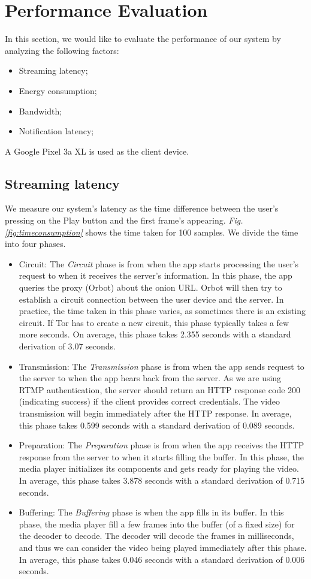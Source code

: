 \section{Performance Evaluation}
In this section, we would like to evaluate the performance of our system by analyzing the following factors:
\begin{itemize}
	\item Streaming latency;
	\item Energy consumption;
	\item Bandwidth;
	\item Notification latency;
\end{itemize}

A Google Pixel 3a XL is used as the client device.

\subsection{Streaming latency}
\label{subsec:streaming_latency}
We measure our system's latency as the time difference between the user’s pressing on the Play button and the first frame’s appearing. \textit{Fig. \ref{fig:timeconsumption}} shows the time taken for 100 samples. We divide the time into four phases.
\begin{itemize}
	\item Circuit: The \textit{Circuit} phase is from when the app starts processing the user’s request to when it receives the server's information. In this phase, the app queries the proxy (Orbot) about the onion URL. Orbot will then try to establish a circuit connection between the user device and the server. In practice, the time taken in this phase varies, as sometimes there is an existing circuit. If Tor has to create a new circuit, this phase typically takes a few more seconds. On average, this phase takes 2.355 seconds with a standard derivation of 3.07 seconds.
	\item Transmission: The \textit{Transmission} phase is from when the app sends request to the server to when the app hears back from the server. As we are using RTMP authentication, the server should return an HTTP response code 200 (indicating success) if the client provides correct credentials. The video transmission will begin immediately after the HTTP response. In average, this phase takes 0.599 seconds with a standard derivation of 0.089 seconds.
	\item Preparation: The \textit{Preparation} phase is from when the app receives the HTTP response from the server to when it starts filling the buffer. In this phase, the media player initializes its components and gets ready for playing the video. In average, this phase takes 3.878 seconds with a standard derivation of 0.715 seconds.
	\item Buffering: The \textit{Buffering} phase is when the app fills in its buffer. In this phase, the media player fill a few frames into the buffer (of a fixed size) for the decoder to decode. The decoder will decode the frames in milliseconds, and thus we can consider the video being played immediately after this phase. In average, this phase takes 0.046 seconds with a standard derivation of 0.006 seconds.
\end{itemize}

